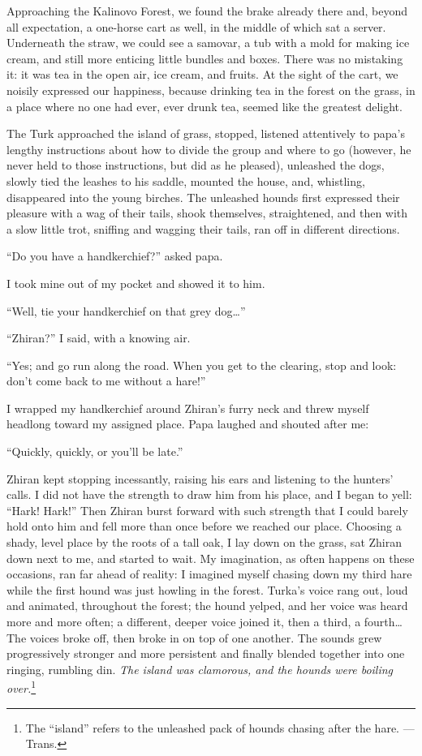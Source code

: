 Approaching the Kalinovo Forest,  we found the brake already there and, beyond all expectation, a one-horse cart as well, in the middle of which sat a server. Underneath the straw, we could see a samovar, a tub with a mold for making ice cream, and still more enticing little bundles and boxes. There was no mistaking it: it was tea in the open air, ice cream, and fruits. At the sight of the cart, we noisily expressed our happiness, because drinking tea in the forest on the grass, in a place where no one had ever, ever drunk tea, seemed like the greatest delight.

The Turk approached the island of grass, stopped, listened attentively to papa's lengthy instructions about how to divide the group and where to go (however, he never held to those instructions, but did as he pleased), unleashed the dogs, slowly tied the leashes to his saddle, mounted the house, and, whistling, disappeared into the young birches. The unleashed hounds first expressed their pleasure with a wag of their tails, shook themselves, straightened, and then with a slow little trot, sniffing and wagging their tails, ran off in different directions.

``Do you have a handkerchief?'' asked papa. %

I took mine out of my pocket and showed it to him.

``Well, tie your handkerchief on that grey dog\ldots{}'' %

``Zhiran?'' I said, with a knowing air. %

``Yes; and go run along the road. When you get to the clearing, stop and look: don't come back to me without a hare!'' %

I wrapped my handkerchief around Zhiran's furry neck and threw myself headlong toward my assigned place. Papa laughed and shouted after me:

``Quickly, quickly, or you'll be late.'' %

Zhiran kept stopping incessantly, raising his ears and listening to the hunters' calls. I did not have the strength to draw him from his place, and I began to yell: ``Hark! Hark!'' Then Zhiran burst forward with such strength that I could barely hold onto him and fell more than once before we reached our place. Choosing a shady, level place by the roots of a tall oak, I lay down on the grass, sat Zhiran down next to me, and started to wait. My imagination, as often happens on these occasions, ran far ahead of reality: I imagined myself chasing down my third hare while the first hound was just howling in the forest. Turka's voice rang out, loud and animated, throughout the forest; the hound yelped, and her voice was heard more and more often; a different, deeper voice joined it, then a third, a fourth\ldots{} The voices broke off, then broke in on top of one another. The sounds grew progressively stronger and more persistent and finally blended together into one ringing, rumbling din.  \textit{The island was clamorous, and the hounds were boiling over.}\footnote{The ``island'' refers to the unleashed pack of hounds chasing after the hare. --- Trans.}

